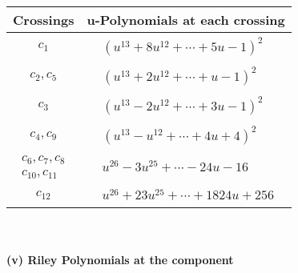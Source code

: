 \documentclass[1p]{elsarticle_modified}
\theoremstyle{definition}
\begin{document}
\begin{tabular}{m{50pt}|m{274pt}}
Crossings & \hspace{64pt}u-Polynomials at each crossing \\
\hline $$\begin{aligned}c_{1}\end{aligned}$$&$\begin{aligned}
&(u^{13}+8 u^{12}+\cdots+5 u-1)^{2}
\end{aligned}$\\
\hline $$\begin{aligned}c_{2},c_{5}\end{aligned}$$&$\begin{aligned}
&(u^{13}+2 u^{12}+\cdots+u-1)^{2}
\end{aligned}$\\
\hline $$\begin{aligned}c_{3}\end{aligned}$$&$\begin{aligned}
&(u^{13}-2 u^{12}+\cdots+3 u-1)^{2}
\end{aligned}$\\
\hline $$\begin{aligned}c_{4},c_{9}\end{aligned}$$&$\begin{aligned}
&(u^{13}- u^{12}+\cdots+4 u+4)^{2}
\end{aligned}$\\
\hline $$\begin{aligned}c_{6},c_{7},c_{8}\\c_{10},c_{11}\end{aligned}$$&$\begin{aligned}
&u^{26}-3 u^{25}+\cdots-24 u-16
\end{aligned}$\\
\hline $$\begin{aligned}c_{12}\end{aligned}$$&$\begin{aligned}
&u^{26}+23 u^{25}+\cdots+1824 u+256
\end{aligned}$\\
\hline
\end{tabular}\\~\\
\newpage\renewcommand{\arraystretch}{1}
\flushleft \textbf{(v) Riley Polynomials at the component}\newline \\
\end{document}
